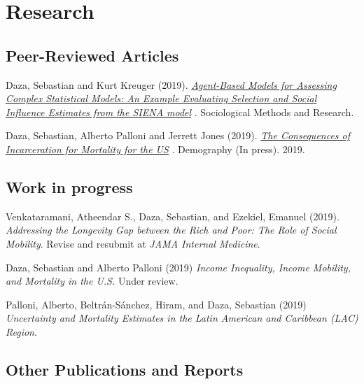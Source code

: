 \documentclass[10pt,letterpaper]{article}
\renewenvironment{itemize}{
  \begin{list}{}{
    \setlength{\leftmargin}{1.5em}
    \setlength{\itemsep}{0.25em}
    \setlength{\parskip}{0pt}
    \setlength{\parsep}{0.25em}
  }
}{
  \end{list}
}
\begin{document}
\section*{Research}

\subsection*{Peer-Reviewed Articles}

\begin{itemize}

\item Daza, Sebastian and Kurt Kreuger (2019).
  \textit{
  \href{https://doi.org/10.1177/0049124119826147}
  {Agent-Based Models for Assessing Complex Statistical Models: An Example Evaluating Selection and Social Influence Estimates from the SIENA model}
  }.
 Sociological Methods and Research.

\item Daza, Sebastian, Alberto Palloni and Jerrett Jones (2019).
  \textit{\href{https://osf.io/preprints/socarxiv/b8xe6/}
  {The Consequences of Incarceration for Mortality for the US}
  }.
  Demography (In press). 2019.


\end{itemize}

\subsection*{Work in progress}

\begin{itemize}

\item Venkataramani, Atheendar S., Daza, Sebastian, and Ezekiel, Emanuel (2019).
  \textit{Addressing the Longevity Gap between the Rich and Poor: The Role of Social Mobility}.
  Revise and resubmit at \textit{JAMA Internal Medicine}.
\item Daza, Sebastian and Alberto Palloni (2019) {\textit{Income Inequality, Income Mobility, and Mortality in the U.S.}} Under review.
\item Palloni, Alberto, Beltrán-Sánchez, Hiram, and Daza, Sebastian (2019) {\textit{Uncertainty and Mortality Estimates in the Latin American and Caribbean (LAC) Region}}.

\end{itemize}

\subsection*{Other Publications and Reports}
\end{document}
